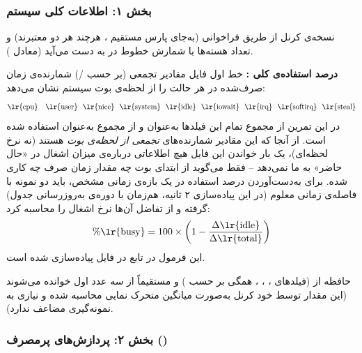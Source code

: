 \subsubsection*{بخش ۱: اطلاعات کلی سیستم}

نسخه‌ی کرنل از طریق فراخوانی  (به‌جای پارس مستقیم ، هرچند هر دو معتبرند) و تعداد هسته‌ها با شمارش خطوط  در  به دست می‌آید (معادل ).

\textbf{درصد استفاده‌ی کلی :} خط اول فایل  مقادیر تجمعی (بر حسب /) شمارنده‌ی زمان صرف‌شده در هر حالت را از لحظه‌ی بوت سیستم نشان می‌دهد:
\[
\text{\lr{cpu}} \quad \text{\lr{user}}\ \ \text{\lr{nice}}\ \ \text{\lr{system}}\ \ \text{\lr{idle}}\ \ \text{\lr{iowait}}\ \ \text{\lr{irq}}\ \ \text{\lr{softirq}}\ \ \text{\lr{steal}}
\]
در این تمرین از مجموع تمام این فیلدها به‌عنوان  و از مجموع  به‌عنوان  استفاده شده است. از آنجا که این مقادیر شمارنده‌های \emph{تجمعی از لحظه‌ی بوت} هستند (نه نرخ لحظه‌ای)، یک بار خواندن این فایل هیچ اطلاعاتی درباره‌ی میزان اشغال  در «حال حاضر» به ما نمی‌دهد -- فقط می‌گوید از ابتدای بوت چه مقدار زمان صرف چه کاری شده. برای به‌دست‌آوردن درصد استفاده در یک بازه‌ی زمانی مشخص، باید دو نمونه با فاصله‌ی زمانی معلوم (در این پیاده‌سازی ۲ ثانیه، هم‌زمان با دوره‌ی به‌روزرسانی جدول) گرفته و از تفاضل آن‌ها نرخ اشغال را محاسبه کرد:
\[
\%\text{\lr{busy}} = 100 \times \left(1 - \frac{\Delta \text{\lr{idle}}}{\Delta \text{\lr{total}}}\right)
\]
این فرمول در تابع  در فایل  پیاده‌سازی شده است.

حافظه از  (فیلدهای ،‏ ،‏ ، همگی بر حسب ) و  مستقیماً از سه عدد اول  خوانده می‌شوند (این مقدار توسط خود کرنل به‌صورت میانگین متحرک نمایی محاسبه شده و نیازی به نمونه‌گیری مضاعف ندارد).

\begin{latin}

\end{latin}

\subsubsection*{بخش ۲: پردازش‌های پرمصرف ()}

